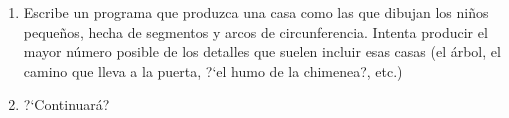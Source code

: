 \begin{appendices}
\begin{enumerate}
 
 
 
 \item Escribe un programa que produzca una casa como las que dibujan los
ni\~nos peque\~nos, hecha de segmentos y arcos de circunferencia. Intenta
producir el mayor n\'umero posible de los detalles que suelen incluir esas casas
(el \'arbol, el camino que lleva a la puerta, ?`el humo de la chimenea?, etc.)
 
 
 
 
 \item {\sc ?`Continuar\'a?}
 
 
 
 \end{enumerate}
 
 
 
 


\end{appendices}
